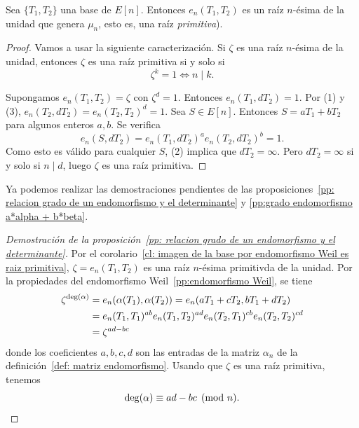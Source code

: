 \begin{corolario}\label{cl: imagen de la base por endomorfismo Weil es raiz primitiva}
	Sea $\{ T_1, T_2 \}$ una base de $E[n]$. Entonces $e_n(T_1, T_2)$ es un raíz $n$-ésima de la unidad que genera $\mu_n$, esto es, una raíz \emph{primitiva}).
\end{corolario}
\begin{proof}
Vamos a usar la siguiente caracterización. Si $\zeta$ es una raíz $n$-ésima de la unidad, entonces $\zeta$ es una raíz primitiva si y solo si
$$
	\zeta^k = 1 \iff n \mid k.
$$

Supongamos $e_n(T_1, T_2) = \zeta$ con $\zeta ^ d = 1$. Entonces $e_n(T_1, d T_2) = 1$. Por (1) y (3), $e_n(T_2, d T_2) = e_n(T_2, T_2)^d = 1$. Sea $S \in E[n]$. Entonces $S = a T_1 + b T_2$ para algunos enteros $a, b$. Se verifica
$$
	e_n(S, d T_2) = e_n(T_1, d T_2)^a e_n(T_2, d T_2)^b = 1.
$$
Como esto es válido para cualquier $S$, (2) implica que $d T_2 = \infty$. Pero $d T_2 = \infty$ si y solo si $n \mid d$, luego $\zeta$ es una raíz primitiva.
\end{proof}

Ya podemos realizar las demostraciones pendientes de las proposiciones~\ref{pp: relacion grado de un endomorfismo y el determinante} y \ref{pp:grado endomorfismo a*alpha + b*beta}.

\begin{proof}[Demostración de la proposición~\ref{pp: relacion grado de un endomorfismo y el determinante}]
Por el corolario~\ref{cl: imagen de la base por endomorfismo Weil es raiz primitiva}, $\zeta = e_n(T_1, T_2)$ es una raíz $n$-ésima primitivda de la unidad. Por la propiedades del endomorfismo Weil~\ref{pp:endomorfismo Weil}, se tiene
\begin{align*}
	\zeta^{\deg(\alpha)} &= e_n(\alpha(T_1),\alpha(T_2)) = e_n(a T_1 + c T_2, b T_1 + d T_2) \\
		&= e_n(T_1, T_1)^{a b} e_n(T_1, T_2)^{a d} e_n(T_2, T_1)^{c b} e_n(T_2, T_2)^{c d} \\
		&= \zeta^{a d - b c}
\end{align*}
donde los coeficientes $a, b, c, d$ son las entradas de la matriz $\alpha_n$ de la definición~\ref{def: matriz endomorfismo}. Usando que $\zeta$ es una raíz primitiva, tenemos
$$
	\deg(\alpha) \equiv a d - b c \pmod{n}.
$$
\end{proof}

